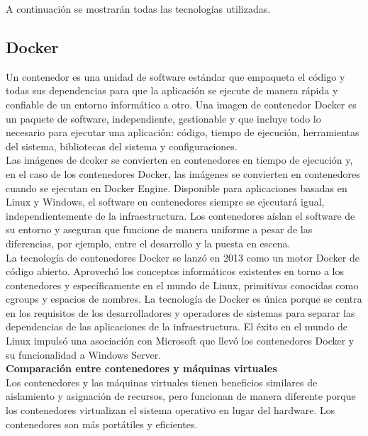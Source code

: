 \documentclass[ spanish, a4paper, 12pt, oneside]{report}
\begin{document}
A continuación se mostrarán todas las tecnologías utilizadas.\\

\subsection{Docker}
Un contenedor es una unidad de software estándar que empaqueta el código y todas sus dependencias para que la aplicación 
se ejecute de manera rápida y confiable de un entorno informático a otro. Una imagen de contenedor Docker es un paquete 
de software, independiente, gestionable y que incluye todo lo necesario para ejecutar una aplicación: código, tiempo 
de ejecución, herramientas del sistema, bibliotecas del sistema y configuraciones.\\

Las imágenes de dcoker se convierten en contenedores en tiempo de ejecución y, en el caso de los contenedores Docker, 
las imágenes se convierten en contenedores cuando se ejecutan en Docker Engine. Disponible para aplicaciones basadas en 
Linux y Windows, el software en contenedores siempre se ejecutará igual, independientemente de la infraestructura. Los 
contenedores aíslan el software de su entorno y aseguran que funcione de manera uniforme a pesar de las diferencias, por 
ejemplo, entre el desarrollo y la puesta en escena.\\

La tecnología de contenedores Docker se lanzó en 2013 como un motor Docker de código abierto. Aprovechó los conceptos 
informáticos existentes en torno a los contenedores y específicamente en el mundo de Linux, primitivas conocidas como 
cgroups y espacios de nombres. La tecnología de Docker es única porque se centra en los requisitos de los desarrolladores 
y operadores de sistemas para separar las dependencias de las aplicaciones de la infraestructura.
El éxito en el mundo de Linux impulsó una asociación con Microsoft que llevó los contenedores Docker y su funcionalidad 
a Windows Server.\\

\textbf{Comparación entre contenedores y máquinas virtuales}\\
Los contenedores y las máquinas virtuales tienen beneficios similares de aislamiento y asignación de recursos, pero 
funcionan de manera diferente porque los contenedores virtualizan el sistema operativo en lugar del hardware. 
Los contenedores son más portátiles y eficientes.\\
\end{document}
